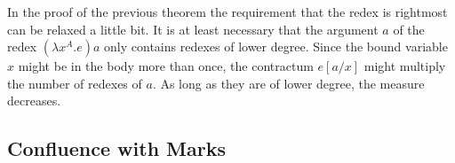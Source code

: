 \begin{remark}
    In the proof of the previous theorem the requirement that the redex is
    rightmost can be relaxed a little bit. It is at least necessary that
    the argument $a$ of the redex $(\lambda x^A.e) a$ only contains
    redexes of lower degree. Since the bound variable $x$ might be in the
    body more than once, the contractum $e[a/x]$ might multiply the number of
    redexes of $a$. As long as they are of lower degree, the measure decreases.
\end{remark}







\subsection{Confluence with Marks}
